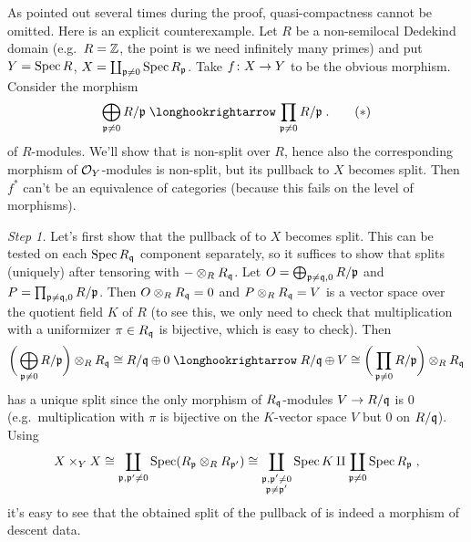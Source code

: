 \documentclass[a4paper,parskip=half,numbers=enddot, DIV=12]{scrreprt}
\begin{document}
\begin{rem}
	As pointed out several times during the proof, quasi-compactness cannot be omitted. Here is an explicit counterexample. Let $R$ be a non-semilocal Dedekind domain (e.g.\ $R=\mathbb{Z}$, the point is we need infinitely many primes) and put $Y=\operatorname{Spec} R$, $X=\coprod_{\mathfrak{p}\neq 0}\operatorname{Spec} R_{\mathfrak{p}}$. Take $f\colon X\morphism Y$ to be the obvious morphism. Consider the morphism
	\begin{align}\lbl{eq:nonSplitButSplit}
		\bigoplus_{\pp\neq 0}R/\pp\monomorphism\prod_{\pp\neq 0}R/\pp\;.\tag{$*$}
	\end{align}
	of $R$-modules. We'll show that  is non-split over $R$, hence also the corresponding morphism of $\mathcal{O}_Y$-modules is non-split, but its pullback to $X$ becomes split. Then $f^*$ can't be an equivalence of categories (because this fails on the level of morphisms).
	
	\emph{Step 1.} Let's first show that the pullback of  to $X$ becomes split. This can be tested on each $\operatorname{Spec} R_{\mathfrak{q}}$ component separately, so it suffices to show that  splits (uniquely) after tensoring with $-\otimes_RR_{\mathfrak{q}}$. Let $O=\bigoplus_{\mathfrak{p}\neq \mathfrak{q},0}R/\mathfrak{p}$ and $P=\prod_{\mathfrak{p}\neq \mathfrak{q},0}R/\mathfrak{p}$. Then $O\otimes_RR_{\mathfrak{q}}=0$ and $P\otimes_RR_{\mathfrak{q}}=V$ is a vector space over the quotient field $K$ of $R$ (to see this, we only need to check that multiplication with a uniformizer $\pi\in R_{\mathfrak{q}}$ is bijective, which is easy to check). Then
	\begin{align*}
		\bigg(\bigoplus_{\pp\neq 0}R/\pp\bigg)\otimes_RR_\qq\cong R/\qq\oplus 0\monomorphism R/\qq\oplus V\cong \bigg(\prod_{\pp\neq 0}R/\pp\bigg)\otimes_RR_\qq
	\end{align*}
	has a unique split since the only morphism of $R_{\mathfrak{q}}$-modules $V\morphism R/\qq$ is $0$ (e.g.\ multiplication with $\pi$ is bijective on the $K$-vector space $V$ but $0$ on $R/\mathfrak{q}$). Using
	\begin{align*}
		X\times_YX\cong \coprod_{\mathfrak{p},\mathfrak{p}'\neq 0}\operatorname{Spec}(R_{\mathfrak{p}}\otimes_RR_{\mathfrak{p}'})\cong \coprod_{\substack{\mathfrak{p},\mathfrak{p}'\neq 0\\\mathfrak{p}\neq \mathfrak{p}'}}\operatorname{Spec} K\amalg \coprod_{\mathfrak{p}\neq 0}\operatorname{Spec} R_{\mathfrak{p}}\;,
	\end{align*}
	it's easy to see that the obtained split of the pullback of  is indeed a morphism of descent data.
	

\end{rem}
\end{document}
